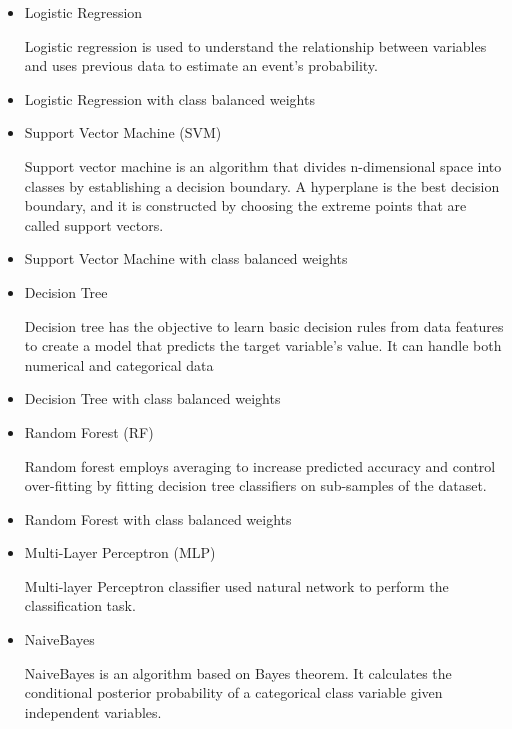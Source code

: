 \begin{itemize}
  \item Logistic Regression
  
  Logistic regression is used to understand the relationship between variables and uses previous data to estimate an event’s probability.
  
  \item Logistic Regression with class balanced weights
  
  \item Support Vector Machine (SVM)
  
  Support vector machine is an algorithm that divides n-dimensional space into classes by establishing a decision boundary. A hyperplane is the best decision boundary, and it is constructed by choosing the extreme points that are called support vectors.
  
  \item Support Vector Machine with class balanced weights
  
  \item Decision Tree
  
  Decision tree has the objective to learn basic decision rules from data features to create a model that predicts the target variable's value. It can handle both numerical and categorical data
  
  \item Decision Tree with class balanced weights
  
  \item Random Forest (RF)
  
  Random forest employs averaging to increase predicted accuracy and control over-fitting by fitting decision tree classifiers on sub-samples of the dataset.
  
  \item Random Forest with class balanced weights
  
  \item Multi-Layer Perceptron (MLP)
  
  Multi-layer Perceptron classifier used natural network to perform the classification task.
  
  \item NaiveBayes
  
  NaiveBayes is an algorithm based on Bayes theorem. It calculates the conditional posterior probability of a categorical class variable given independent variables.
  
\end{itemize}
